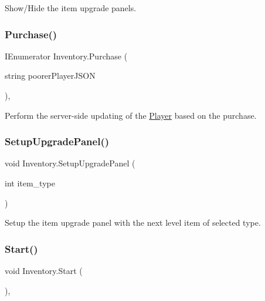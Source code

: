 Show/\+Hide the item upgrade panels. 

\mbox{\label{class_inventory_a6be0d5d14468b2eb9cba732c3f65c3e5}} 
\subsubsection{\texorpdfstring{Purchase()}{Purchase()}}
{\footnotesize\ttfamily I\+Enumerator Inventory.\+Purchase (\begin{DoxyParamCaption}\item[{string}]{poorer\+Player\+J\+S\+ON }\end{DoxyParamCaption})\hspace{0.3cm}{\ttfamily [inline]}, {\ttfamily [private]}}



Perform the server-\/side updating of the \mbox{\hyperlink{class_player}{Player}} based on the purchase. 

\mbox{\label{class_inventory_aa99e2b5246a749ec59f04aa1ce48416a}} 
\subsubsection{\texorpdfstring{SetupUpgradePanel()}{SetupUpgradePanel()}}
{\footnotesize\ttfamily void Inventory.\+Setup\+Upgrade\+Panel (\begin{DoxyParamCaption}\item[{int}]{item\+\_\+type }\end{DoxyParamCaption})\hspace{0.3cm}{\ttfamily [inline]}}



Setup the item upgrade panel with the next level item of selected type. 

\mbox{\label{class_inventory_aa5a9d430aff1ecd12a75901608d337ea}} 
\subsubsection{\texorpdfstring{Start()}{Start()}}
{\footnotesize\ttfamily void Inventory.\+Start (\begin{DoxyParamCaption}{ }\end{DoxyParamCaption})\hspace{0.3cm}{\ttfamily [inline]}, {\ttfamily [private]}}



